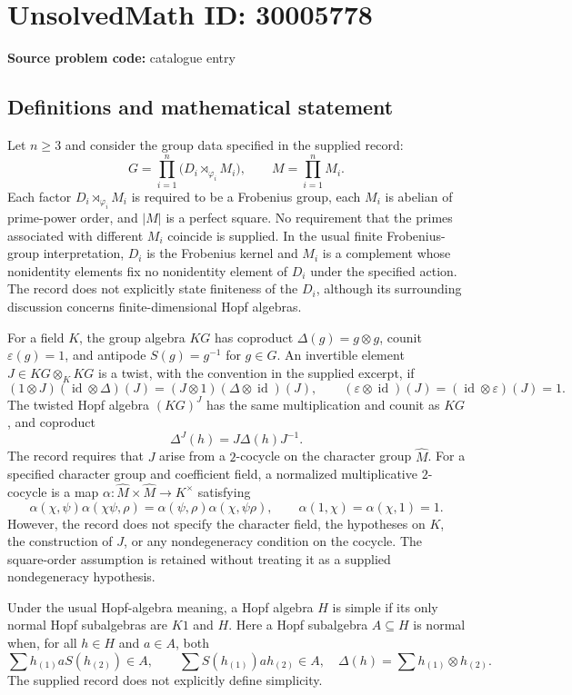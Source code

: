 \documentclass[11pt]{article}
\begin{document}
\section*{UnsolvedMath ID: 30005778}
\textbf{Source problem code:} catalogue entry
\subsection{Definitions and mathematical statement}
Let \(n\geq 3\) and consider the group data specified in the supplied record:
\[
G=\prod_{i=1}^{n}\bigl(D_i\rtimes_{\varphi_i}M_i\bigr),
\qquad M=\prod_{i=1}^{n}M_i.
\]
Each factor \(D_i\rtimes_{\varphi_i}M_i\) is required to be a Frobenius group, each \(M_i\) is abelian of prime-power order, and \(|M|\) is a perfect square. No requirement that the primes associated with different \(M_i\) coincide is supplied. In the usual finite Frobenius-group interpretation, \(D_i\) is the Frobenius kernel and \(M_i\) is a complement whose nonidentity elements fix no nonidentity element of \(D_i\) under the specified action. The record does not explicitly state finiteness of the \(D_i\), although its surrounding discussion concerns finite-dimensional Hopf algebras.

For a field \(K\), the group algebra \(KG\) has coproduct \(\Delta(g)=g\otimes g\), counit \(\varepsilon(g)=1\), and antipode \(S(g)=g^{-1}\) for \(g\in G\). An invertible element \(J\in KG\otimes_K KG\) is a twist, with the convention in the supplied excerpt, if
\[
(1\otimes J)(\operatorname{id}\otimes\Delta)(J)
=(J\otimes1)(\Delta\otimes\operatorname{id})(J),
\qquad
(\varepsilon\otimes\operatorname{id})(J)
=(\operatorname{id}\otimes\varepsilon)(J)=1.
\]
The twisted Hopf algebra \((KG)^J\) has the same multiplication and counit as \(KG\), and coproduct
\[
\Delta^J(h)=J\Delta(h)J^{-1}.
\]
The record requires that \(J\) arise from a \(2\)-cocycle on the character group \(\widehat M\). For a specified character group and coefficient field, a normalized multiplicative \(2\)-cocycle is a map \(\alpha:\widehat M\times\widehat M\to K^\times\) satisfying
\[
\alpha(\chi,\psi)\alpha(\chi\psi,\rho)
=\alpha(\psi,\rho)\alpha(\chi,\psi\rho),
\qquad
\alpha(1,\chi)=\alpha(\chi,1)=1.
\]
However, the record does not specify the character field, the hypotheses on \(K\), the construction of \(J\), or any nondegeneracy condition on the cocycle. The square-order assumption is retained without treating it as a supplied nondegeneracy hypothesis.

Under the usual Hopf-algebra meaning, a Hopf algebra \(H\) is simple if its only normal Hopf subalgebras are \(K1\) and \(H\). Here a Hopf subalgebra \(A\subseteq H\) is normal when, for all \(h\in H\) and \(a\in A\), both
\[
\sum h_{(1)}aS(h_{(2)})\in A,
\qquad
\sum S(h_{(1)})ah_{(2)}\in A,
\quad
\Delta(h)=\sum h_{(1)}\otimes h_{(2)}.
\]
The supplied record does not explicitly define simplicity.
\end{document}

